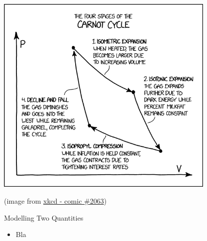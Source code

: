 %
%


\begin{topic}



\vfil

\begin{center}
\begin{minipage}{300pt}
	\includegraphics*[width=300pt]{images/chap3-xkcd.png}

	\hfill {\footnotesize (image from \href{https://www.xkcd.com/2063/}{xkcd - comic \#2063})}
\end{minipage}
\end{center}


\end{topic}






%
%



\begin{module}{Modelling Two Quantities}
	\label{sys:model}

	
	
\end{module}



\begin{lesson}

	\begin{itemize}
		\item Bla
	\end{itemize}
	

\end{lesson}




